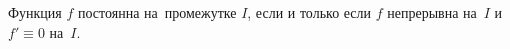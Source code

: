 \label{LS1}
    Функция $f$ постоянна на~промежутке $I$, если и только если $f$ непрерывна на~$I$ и $f'\equiv0$ на~$I$.
